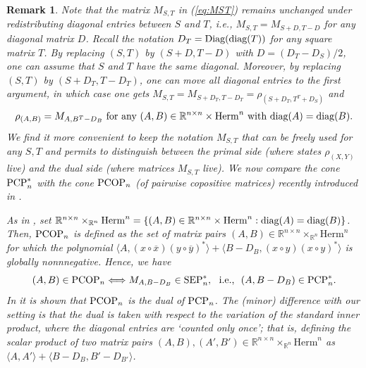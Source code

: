 \documentclass[11pt]{article}
\newcommand{\R}{\ensuremath{\mathbb{R}}}   %
\newcommand{\Herm}{\mathrm{Herm}}
\newcommand{\PCP}{\text{\rm PCP}}
\newcommand{\SEP}{\text{\rm SEP}}
\newcommand{\PCOP}{\text{\rm PCOP}}
\newcommand{\diag}{\text{\rm diag}}
\newcommand{\Diag}{\text{\rm Diag}}
\newcommand{\ovx}{\overline x}
\newcommand{\ovy}{\overline y}
\theoremstyle{plain}
\newtheorem{remark}[satz]{Remark}
\begin{document}
\begin{remark}\label{rem:compare-PCP-GNP}
Note that the  matrix $M_{S,T}$ in (\ref{eq:MST}) remains unchanged under  redistributing diagonal entries between $S$ and $T$, i.e.,   $M_{S,T}=M_{S+D,T-D}$   for any diagonal matrix $D$. 
Recall the notation $D_T=\Diag(\diag(T))$ for any square matrix $T$.
By  replacing $(S,T)$ by $(S+D,T-D)$ with $D=(D_T-D_S)/2$, one can   assume that $S$ and $T$ have the same diagonal. Moreover,
by   replacing $(S,T)$ by $(S+D_T, T-D_T)$, one can move all diagonal entries to the first argument, in which case  one gets 
$M_{S,T}= M_{S+D_T, T-D_T}=\rho_{(S+D_T, T^T +D_S)}$ and 
\begin{align}\label{eq:MST-AB-GNP}
\rho_{(A,B)}=M_{A, B^T-D_B} \text{ for any } (A,B)\in\R^{n\times n}\times\Herm^n \text{ with } \diag(A)=\diag(B).
\end{align}
We find it more convenient  %
to keep the notation $M_{S,T}$ that can be freely used for {\em any} $S,T$ and permits   to distinguish between the primal side (where states $\rho_{(X,Y)}$ live) and the dual side (where matrices $M_{S,T}$ live). 
We now compare the cone $\PCP_n^*$ with the cone  $\PCOP_n$ (of {\em pairwise copositive matrices})  recently  introduced in   \cite[Def. 3.1]{GNP_2025}. 

 As in \cite{GNP_2025}, set
$\R^{n\times n}\times_{\R^n} \Herm^n=\{(A,B)\in \R^{n\times n}\times \Herm^n: \diag(A)=\diag(B)\}$.
Then,   $\PCOP_n$ is defined  as the set of matrix pairs $(A,B)\in \R^{n\times n}\times_{\R^n}  \Herm^n$ for which  the polynomial 
$\langle A, (x\circ \ovx)(y\circ \ovy)^*\rangle +\langle B-D_B, (x\circ y) (x\circ y)^*\rangle  $ is globally nonnnegative. Hence, we have
$$(A,B)\in \PCOP_n \Longleftrightarrow M_{A,B-D_B}\in \SEP_n^*, \ \text{ i.e., } \ (A,B-D_B)\in\PCP_n^*.$$
 In \cite[Prop. 3.2]{GNP_2025} it is shown that $\PCOP_n$ is the dual of $\PCP_n$. The (minor) difference with our setting is that  the dual is taken with respect to  the variation of the standard inner product, where the diagonal entries are `counted only once'; that is, defining the scalar product of two matrix pairs $(A,B),(A',B')\in \R^{n\times n}\times_{\R^n}\Herm^n$  as
   $\langle A,A'\rangle +\langle B-D_B, B'-D_{B'}\rangle$.
   

\end{remark}
\end{document}
